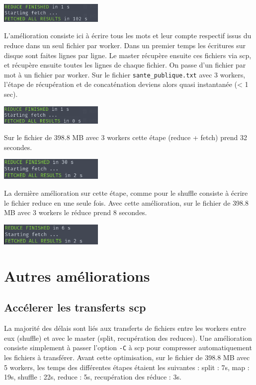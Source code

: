 \documentclass[11pt,a4paper]{article}
\begin{document}
\includegraphics[width=5cm]{screenshot_reduce1.png}

L'amélioration consiste ici à écrire tous les mots et leur compte respectif issus du reduce dans un seul fichier par worker. Dans un premier temps les écritures sur disque sont faites lignes par ligne. Le master récupère ensuite ces fichiers via scp, et récupère ensuite toutes les lignes de chaque fichier. On passe d'un fichier par mot à un fichier par worker. Sur le fichier \texttt{sante\_publique.txt} avec 3 workers, l'étape de récupération et de concaténation deviens alors quasi instantanée (< 1 sec).

\includegraphics[width=5cm]{screenshot_reduce2.png}

Sur le fichier de 398.8 MB avec 3 workers cette étape (reduce + fetch) prend 32 secondes.

\includegraphics[width=5cm]{screenshot_reduce3.png}

La dernière amélioration sur cette étape, comme pour le shuffle consiste à écrire le fichier reduce en une seule fois. Avec cette amélioration, sur le fichier de 398.8 MB avec 3 workers le réduce prend 8 secondes.

\includegraphics[width=5cm]{screenshot_reduce4.png}

\section{Autres améliorations}
\subsection*{Accélerer les transferts scp}
La majorité des délais sont liés aux transferts de fichiers entre les workers entre eux (shuffle) et avec le master (split, recupération des reduces). Une amélioration consiste simplement à passer l'option \texttt{-C} à scp pour compresser automatiquement les fichiers à transférer. Avant cette optimisation, sur le fichier de 398.8 MB avec 5 workers, les temps des différentes étapes étaient les suivantes : split : 7s, map : 19s, shuffle : 22s, reduce : 5s, recupération des réduce : 3s.
\end{document}
